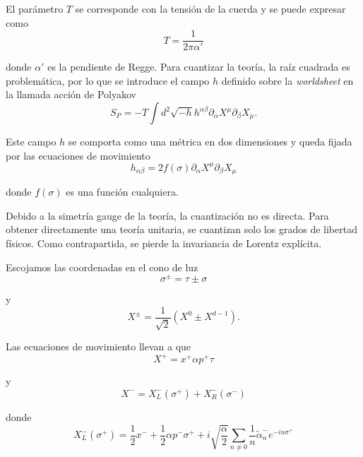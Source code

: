 El parámetro $T$ se corresponde con la tensión de la cuerda y se puede expresar como
\begin{equation}
  T=\frac{1}{2\pi\alpha'}
\end{equation}

donde $\alpha'$ es la pendiente de Regge.
Para cuantizar la teoría, la raíz cuadrada es problemática, por lo que se introduce
el campo $h$ definido sobre la \emph{worldsheet} en la llamada acción de Polyakov
\begin{equation}
  S_P=-T\int d^2  \sqrt{-h}h^{\alpha\beta}\partial_\alpha X^\mu \partial_\beta X_\mu.
\end{equation}

Este campo $h$ se comporta como una métrica en dos dimensiones y queda fijada por las
ecuaciones de movimiento
\begin{equation}
  h_{\alpha\beta}=2f(\sigma)\partial_\alpha X^\mu \partial_\beta X_\mu
\end{equation}

donde $f(\sigma)$ es una función cualquiera.


Debido a la simetría gauge de la teoría, la cuantización no es directa.
Para obtener directamente una teoría unitaria, se cuantizan solo los grados de libertad 
físicos. Como contrapartida, se pierde la invariancia de Lorentz explícita.

Escojamos las coordenadas en el cono de luz
\begin{equation}
  \sigma^\pm=\tau\pm\sigma
\end{equation}

y
\begin{equation}
  X^\pm=\frac{1}{\sqrt 2} (X^0 \pm X^{d-1}).
\end{equation}

Las ecuaciones de movimiento llevan a que 
\begin{equation}
  X^+=x^+\alpha p^+ \tau
\end{equation}

y
\begin{equation}
  X^-=X^-_L(\sigma^+)+X^-_R(\sigma^-)
\end{equation}

donde 
\begin{equation}
  X^-_L(\sigma^+)=\frac 1 2 x^- + \frac 1 2 \alpha p^- \sigma^+ + i\sqrt{\frac \alpha 2}
  \sum_{n\neq0} \frac 1 n \tilde{\alpha}^-_n e^{-in\sigma^+}
\end{equation}

